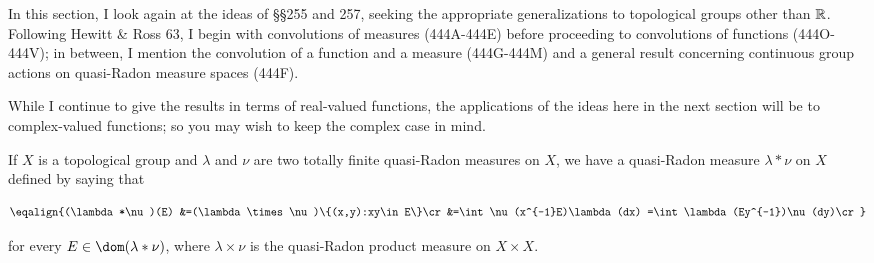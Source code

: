 
\def\esssup{\mathop{\text{ess sup}}}
\def\ssplrarrow{^{\scriptscriptstyle\leftrightarrow}}

\def\chaptername{Topological groups}
\def\sectionname{Convolutions}


In this section, I look again at the ideas of \S\S255 and 257, seeking
the appropriate generalizations to topological groups other than
$\Bbb R$.   Following {\smc Hewitt \& Ross 63}, I begin with
convolutions of measures (444A-444E) %
before proceeding to convolutions of functions
(444O-444V); %
in between, I mention the convolution of a function and a measure
(444G-444M) %
and a general result concerning continuous group actions on
quasi-Radon measure spaces (444F).

While I continue to give the results in terms of
real-valued functions, the applications
of the ideas here in the next section will be to complex-valued functions;
so you may wish to keep the complex case in mind.

 If $X$ is a
topological group and $\lambda$ and $\nu$ are two totally finite
quasi-Radon measures on $X$, we have a quasi-Radon measure $\lambda*\nu$
on $X$ defined by saying that

$$\eqalign{(\lambda*\nu)(E)
&=(\lambda\times\nu)\{(x,y):xy\in E\}\cr
&=\int\nu(x^{-1}E)\lambda(dx)
=\int\lambda(Ey^{-1})\nu(dy)\cr}$$

\noindent for every $E\in\dom(\lambda*\nu)$, where $\lambda\times\nu$ is
the quasi-Radon product measure on $X\times X$.


